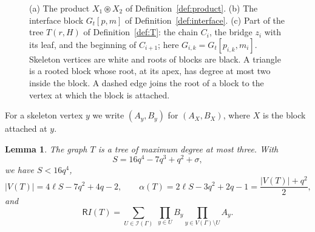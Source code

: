 \documentclass[11pt]{amsart}
\newtheorem{lemma}[theorem]{Lemma}
\theoremstyle{definition}
\theoremstyle{remark}
\numberwithin{equation}{section}
\newcommand{\cI}{\mathcal{I}}
\newcommand{\R}{\mathsf{R}}
\newcommand{\cs}{\circledast}
\begin{document}
\begin{figure}[t]
\caption{(a) The product $X_1\cs X_2$ of Definition~\ref{def:product}. (b) The interface block $G_t[p,m]$ of Definition~\ref{def:interface}. (c) Part of the tree $T(r,H)$ of Definition~\ref{def:T}: the chain $C_i$, the bridge $z_i$ with its leaf, and the beginning of $C_{i+1}$; here $G_{i,k}=G_t[p_{i,k},m_i]$. Skeleton vertices are white and roots of blocks are black. A triangle is a rooted block whose root, at its apex, has degree at most two inside the block. A dashed edge joins the root of a block to the vertex at which the block is attached.}
\label{fig:construction}
\end{figure}

For a skeleton vertex $y$ we write $(A_y,B_y)$ for $(A_X,B_X)$, where $X$ is the block attached at $y$.

\begin{lemma}\label{lem:T}
The graph $T$ is a tree of maximum degree at most three. With
\begin{equation}\label{eq:S}
S=16q^4-7q^3+q^2+\sigma,
\end{equation}
we have $S<16q^4$,
\begin{equation}\label{eq:size}
|V(T)|=4\ell S-7q^2+4q-2,\qquad\alpha(T)=2\ell S-3q^2+2q-1=\frac{|V(T)|+q^2}2,
\end{equation}
and
\begin{equation}\label{eq:RT}
\R I(T)=\sum_{U\in\cI(\Gamma)}\ \prod_{y\in U}B_y\prod_{y\in V(\Gamma)\setminus U}A_y.
\end{equation}
\end{lemma}
\end{document}
